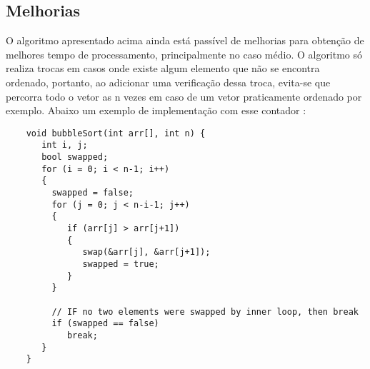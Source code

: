 \documentclass[12pt]{article}
\begin{document}
\subsection{Melhorias}
O algoritmo apresentado acima ainda está passível de melhorias para obtenção de melhores tempo de processamento, principalmente no caso médio. O algoritmo só realiza trocas em casos onde existe algum elemento que não se encontra ordenado, portanto, ao adicionar uma verificação dessa troca, evita-se que percorra todo o vetor as n vezes em caso de um vetor praticamente ordenado por exemplo. Abaixo um exemplo de implementação com esse contador \cite{bubbleSort}:
    \begin{lstlisting}
    void bubbleSort(int arr[], int n) { 
       int i, j; 
       bool swapped; 
       for (i = 0; i < n-1; i++) 
       { 
         swapped = false; 
         for (j = 0; j < n-i-1; j++) 
         { 
            if (arr[j] > arr[j+1]) 
            { 
               swap(&arr[j], &arr[j+1]); 
               swapped = true; 
            } 
         } 
      
         // IF no two elements were swapped by inner loop, then break
         if (swapped == false) 
            break; 
       } 
    } 
    \end{lstlisting}


\end{document}
